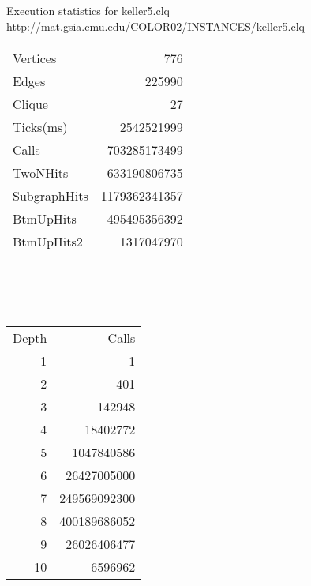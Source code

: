 \documentclass[landscape]{slides}
\begin{document}
\begin{slide}
	\begin{center}
		Execution statistics for keller5.clq \\
		http://mat.gsia.cmu.edu/COLOR02/INSTANCES/keller5.clq \\
	\end{center}
	\begin{tabular}{ l r }
		Vertices & 776 \\
		Edges & 225990 \\
		Clique & 27 \\
		Ticks(ms) & 2542521999 \\
		Calls & 703285173499 \\
		TwoNHits & 633190806735 \\
		SubgraphHits & 1179362341357 \\
		BtmUpHits & 495495356392 \\
		BtmUpHits2 & 1317047970 \\
	\end{tabular}
	\\ \\ \\
	\begin{tabular}{ r r }
		Depth &		 Calls \\
		1 &               1 \\
		2 &             401 \\
		3 &          142948 \\
		4 &        18402772 \\
		5 &      1047840586 \\
		6 &     26427005000 \\
		7 &    249569092300 \\
		8 &    400189686052 \\
		9 &     26026406477 \\
		10 &        6596962  \\
	\end{tabular}
\end{slide}
\end{document}
